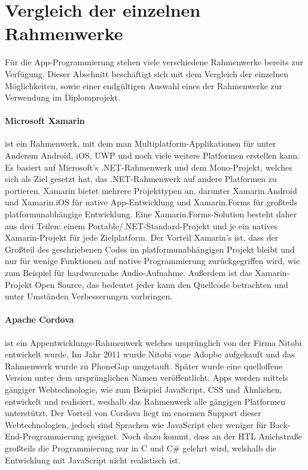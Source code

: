 \section{Vergleich der einzelnen Rahmenwerke}
%
Für die App-Programmierung stehen viele verschiedene Rahmenwerke bereits zur Verfügung.
Dieser Abschnitt beschäftigt sich mit dem Vergleich der einzelnen Möglichkeiten, sowie einer endgültigen Auswahl eines der Rahmenwerke zur Verwendung im Diplomprojekt.

\paragraph{Microsoft Xamarin}
ist ein Rahmenwerk, mit dem man Multiplatform-Applikationen für unter Anderem Android, iOS, UWP und noch viele weitere Platformen erstellen kann.
Es basiert auf Microsoft's .NET-Rahmenwerk und dem Mono-Projekt, welches sich als Ziel gesetzt hat, das .NET-Rahmenwerk auf andere Platformen zu portieren.
Xamarin bietet mehrere Projekttypen an, darunter Xamarin.Android und Xamarin.iOS für native App-Entwicklung und Xamarin.Forms für großteils platformunabhängige Entwicklung.
Eine Xamarin.Forms-Solution besteht daher aus drei Teilen: einem Portable/.NET-Standard-Projekt und je ein natives Xamarin-Projekt für jede Zielplatform.
Der Vorteil Xamarin's ist, dass der Großteil des geschriebenen Codes im platformunabhängigen Projekt bleibt und nur für wenige Funktionen auf native Programmierung zurückgegriffen wird, wie zum Beispiel für hardwarenahe Audio-Aufnahme.
Außerdem ist das Xamarin-Projekt Open Source, das bedeutet jeder kann den Quellcode betrachten und unter Umständen Verbesserungen vorbringen.

\paragraph{Apache Cordova}
ist ein Appentwicklungs-Rahmenwerk welches ursprünglich von der Firma Nitobi entwickelt wurde.
Im Jahr 2011 wurde Nitobi vone Adopbe aufgekauft und das Rahmenwerk wurde zu PhoneGap umgetauft.
Später wurde eine quelloffene Version unter dem ursprünglichen Namen veröffentlicht.
Apps werden mittels gängiger Webtechnologie, wie zum Beispiel JavaScript, CSS und Ähnlichen, entwickelt und realisiert, weshalb das Rahmenwerk alle gängigen Platformen unterstützt.
Der Vorteil von Cordova liegt im enormen Support dieser Webtechnologien, jedoch sind Sprachen wie JavaScript eher weniger für Back-End-Programmierung geeignet.
Noch dazu kommt, dass an der HTL Anichstraße großteils die Programmierung nur in C und C\# gelehrt wird, welshalb die Entwicklung mit JavaScript nicht realistisch ist.
